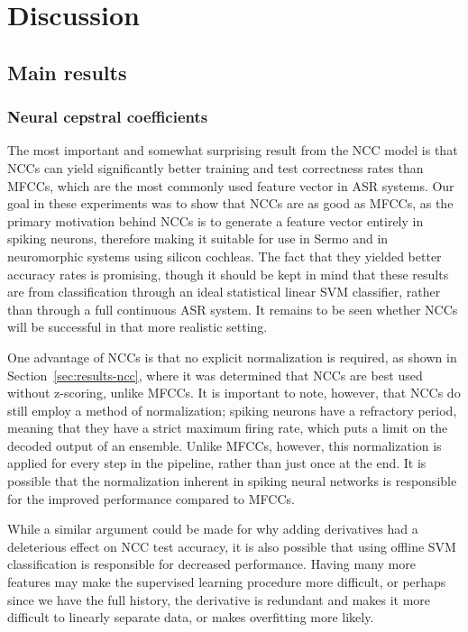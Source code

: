 \chapter{Discussion}
\label{chapt:discussion}

\section{Main results}

\subsection{Neural cepstral coefficients}

The most important and somewhat surprising result
from the NCC model
is that NCCs can yield significantly
better training and test correctness rates than MFCCs,
which are the most commonly used
feature vector in ASR systems.
Our goal in these experiments was to
show that NCCs are as good as MFCCs,
as the primary motivation behind
NCCs is to generate a feature vector
entirely in spiking neurons,
therefore making it suitable
for use in Sermo
and in neuromorphic systems using
silicon cochleas.
The fact that they yielded
better accuracy rates
is promising,
though it should be kept in mind
that these results
are from classification through
an ideal statistical linear SVM classifier,
rather than through
a full continuous ASR system.
It remains to be seen
whether NCCs will be successful
in that more realistic setting.

One advantage of NCCs is that
no explicit normalization is required,
as shown in Section~\ref{sec:results-ncc},
where it was determined
that NCCs are best used
without z-scoring, unlike MFCCs.
It is important to note, however,
that NCCs do still employ a method
of normalization;
spiking neurons have a refractory period,
meaning that they have a strict maximum firing rate,
which puts a limit on the
decoded output of an ensemble.
Unlike MFCCs, however,
this normalization is applied
for every step in the pipeline,
rather than just once at the end.
It is possible that
the normalization inherent in
spiking neural networks
is responsible for the improved performance
compared to MFCCs.

While a similar argument could be made
for why adding derivatives had
a deleterious effect on
NCC test accuracy,
it is also possible that
using offline SVM classification
is responsible for decreased performance.
Having many more features
may make the supervised learning procedure
more difficult,
or perhaps since we have the full history,
the derivative is redundant
and makes it more difficult
to linearly separate data,
or makes overfitting more likely.

